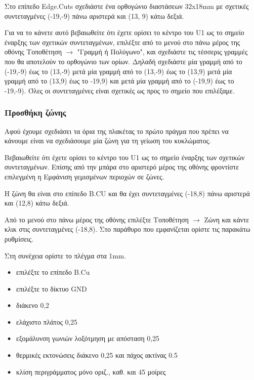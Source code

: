 \documentclass[a4paper]{article}
\begin{document}
Στο επίπεδο Edge.Cuts σχεδιάστε ένα ορθογώνιο διαστάσεων 32x18mm με σχετικές συντεταγμένες (-19,-9) πάνω αριστερά και (13, 9) κάτω δεξιά. 

Για να το κάνετε αυτό βεβαιωθείτε ότι έχετε ορίσει το κέντρο του U1  ως το σημείο έναρξης των σχετικών συντεταγμένων, επιλέξτε από το μενού στο πάνω μέρος της οθόνης Τοποθέτηση $\rightarrow$ "Γραμμή ή Πολύγωνο", και σχεδιάστε τις τέσσερις γραμμές που θα αποτελούν το ορθογώνιο των ορίων. Δηλαδή σχεδιάστε μία γραμμή από το (-19,-9) έως το (13,-9) μετά μία γραμμή από το (13,-9) έως το (13,9) μετά μία γραμμή από το (13,9) έως το -19,9) και μετά μία γραμμή από το (-19,9) έως το -19,-9). Όλες οι συντεταγμένες είναι σχετικές ως προς το σημείο που επιλέξαμε.


\subsubsection{Προσθήκη ζώνης}
Αφού έχουμε σχεδιάσει τα όρια της πλακέτας το πρώτο πράγμα που πρέπει να κάνουμε είναι να σχεδιάσουμε μία ζώνη για τη γείωση του κυκλώματος. 

Βεβαιωθείτε ότι έχετε ορίσει το κέντρο του U1  ως το σημείο έναρξης των σχετικών συντεταγμένων. Επίσης από την μπάρα στο αριστερό μέρος της οθόνης φροντίστε επιλεγμένη η Εμφάνιση γεμισμένων περιοχών σε ζώνες. %

Η ζώνη θα είναι στο επίπεδο B.CU και θα έχει συντεταγμένες (-18,8) πάνω αριστερά και (12,8) κάτω δεξιά. 

Από το μενού στο πάνω μέρος της οθόνης επιλέξτε Τοποθέτηση $\rightarrow$ Ζώνη και κάντε κλικ στις συντεταγμένες (-18,8). Στο παράθυρο που εμφανίζεται ορίστε τις παρακάτω ρυθμίσεις.


Στη συνέχεια ορίστε το πλέγμα στα 1mm.

\begin{itemize}
    \item επιλέξτε το επίπεδο B.Cu
    \item επιλέξτε το δίκτυο GND
    \item διάκενο 0,2
    \item ελάχιστο πλάτος 0,25
    \item εξομάλυνση γωνιών λοξότμηση με απόσταση 0,25
    \item θερμικές εκτονώσεις διάκενο 0,25 και πάχος ακτίνας 0.5
    \item κλίση περιγράμματος μόνο οριζ., καθ. και 45 μοίρες
\end{itemize}
\end{document}
